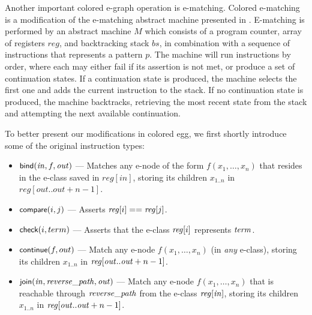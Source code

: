 \begin{comment}
We update the auxiliary function \textsc{repair}
to work on colored e-classes,
and introduce two new helper functions: $\textsc{collect\_parents}$ and $\textsc{update\_hashcons}$, as presented in \autoref{functional:repair}.
$\textsc{collect\_parents}$ extract the parents of a colored e-class by combining the sets of parents of all the (root) e-classes contained therein.
$\textsc{update\_hashcons}$ is used to make sure that the hashcons entries are in canonical forms. It was already a part of \textsc{repair} in egg;
it is only repeated here to point out that it
only updates the hashcons for the root color,
since no canonization is required for colored layers.    
\end{comment}

Another important colored e-graph operation is e-matching.
Colored e-matching is a modification of the e-matching abstract machine presented in \cite{DBLP:conf/cade/MouraB07}.
E-matching is performed by an abstract machine $M$ which consists of a program counter, array of registers $reg$, and backtracking stack $bs$, in combination with a sequence of instructions that represents a pattern $p$. 
The machine will run instructions by order, where each may either fail if its assertion is not met, or produce a set of continuation states.
If a continuation state is produced, the machine selects the first one and adds the current instruction to the stack. 
If no continuation state is produced, the machine backtracks, retrieving the most recent state from the stack and attempting the next available continuation.

To better present our modifications in colored egg, we first shortly introduce some of the original instruction types:
\begin{itemize}[leftmargin=1.1em]
    \item $\ibind(\tin, f, \tout)$ --- Matches any e-node of the form $f(x_1,\ldots,x_n)$ that resides in the e-class saved in $reg[in]$, storing its children $x_{1..n}$ in $reg[out..out+n-1]$.
    \item $\icompare(i, j)$ --- Asserts $\mathit{reg}[i] == \mathit{reg}[j]$.
    \item $\icheck(i, term)$ --- Asserts that the e-class $\mathit{reg}[i]$ represents $\mathit{term}$.
    \item $\icontinue(f, out)$ --- Match any e-node 
    $f(x_1,\ldots,x_n)$ (in \emph{any} e-class),
    storing its children $x_{1..n}$ in $\mathit{reg}[\mathit{out}..\mathit{out}+n-1]$.
    \item $\ijoin(\tin, \trevpath, \tout)$ --- Match any e-node
    $f(x_1,\ldots,x_n)$ that is reachable through $\mathit{reverse\_path}$
    from the e-class $\mathit{reg}[\mathit{in}]$,
    storing its children $x_{1..n}$ in $\mathit{reg}[\mathit{out}..\mathit{out}+n-1]$.
\end{itemize}


